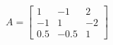 \documentclass[preview]{standalone}
\begin{document}
\begin{align*}
A = \begin{bmatrix} 1 & -1 & 2 \\ -1 & 1 & -2 \\ 0.5 & -0.5 & 1 \end{bmatrix}
\end{align*}
\end{document}
